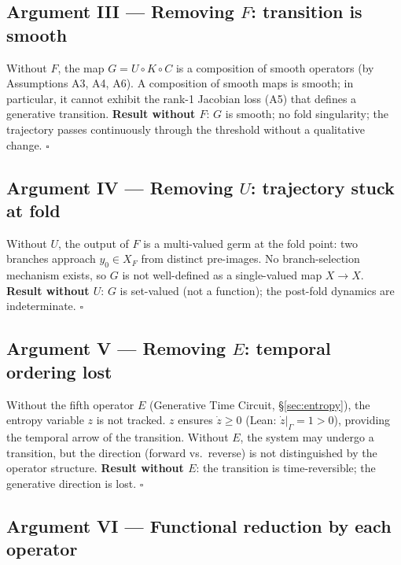 \documentclass[14pt,a4paper]{extarticle}
\begin{document}
\subsection*{Argument III\; — Removing $F$: transition is smooth}

Without $F$, the map $G = U \circ K \circ C$ is a composition of
smooth operators (by Assumptions A3, A4, A6).
A composition of smooth maps is smooth; in particular, it cannot
exhibit the rank-1 Jacobian loss (A5) that defines a generative
transition.
\textbf{Result without $F$}: $G$ is smooth; no fold singularity;
the trajectory passes continuously through the threshold without
a qualitative change.  \hfill $\square$

\subsection*{Argument IV\; — Removing $U$: trajectory stuck at fold}

Without $U$, the output of $F$ is a multi-valued germ at the fold
point: two branches approach $y_0 \in X_F$ from distinct pre-images.
No branch-selection mechanism exists, so $G$ is not well-defined
as a single-valued map $X \to X$.
\textbf{Result without $U$}: $G$ is set-valued (not a function);
the post-fold dynamics are indeterminate.  \hfill $\square$

\subsection*{Argument V\; — Removing $E$: temporal ordering lost}

Without the fifth operator $E$ (Generative Time Circuit, \S\ref{sec:entropy}),
the entropy variable $z$ is not tracked.
$z$ ensures $\dot z \ge 0$ (Lean: $\dot z|_\Gamma = 1 > 0$),
providing the temporal arrow of the transition.
Without $E$, the system may undergo a transition, but the
direction (forward vs.\ reverse) is not distinguished by the
operator structure.
\textbf{Result without $E$}: the transition is time-reversible;
the generative direction is lost.  \hfill $\square$

\subsection*{Argument VI\; — Functional reduction by each operator}
\end{document}
